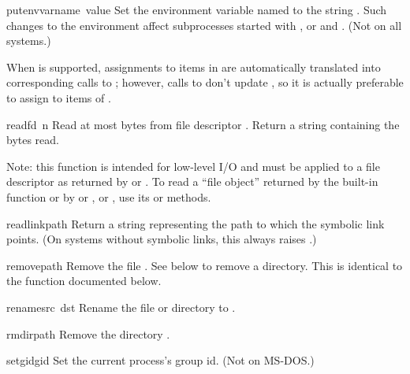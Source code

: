 \begin{funcdesc}{putenv}{varname\, value}
Set the environment variable named  to the string .  
Such changes to the environment affect
subprocesses started with ,  or
 and .  (Not on all systems.)

When  is
supported, assignments to items in  are automatically
translated into corresponding calls to ; however,
calls to  don't update , so it is
actually preferable to assign to items of .  
\end{funcdesc}

\begin{funcdesc}{read}{fd\, n}
Read at most  bytes from file descriptor .
Return a string containing the bytes read.

Note: this function is intended for low-level I/O and must be applied
to a file descriptor as returned by  or
.  To read a ``file object'' returned by the
built-in function  or by  or
, or , use its
 or  methods.
\end{funcdesc}

\begin{funcdesc}{readlink}{path}
Return a string representing the path to which the symbolic link
points.  (On systems without symbolic links, this always raises
.)
\end{funcdesc}

\begin{funcdesc}{remove}{path}
Remove the file .  See  below to remove a directory.
This is identical to the  function documented below.
\end{funcdesc}

\begin{funcdesc}{rename}{src\, dst}
Rename the file or directory  to .
\end{funcdesc}

\begin{funcdesc}{rmdir}{path}
Remove the directory .
\end{funcdesc}

\begin{funcdesc}{setgid}{gid}
Set the current process's group id.
(Not on MS-DOS.)
\end{funcdesc}

